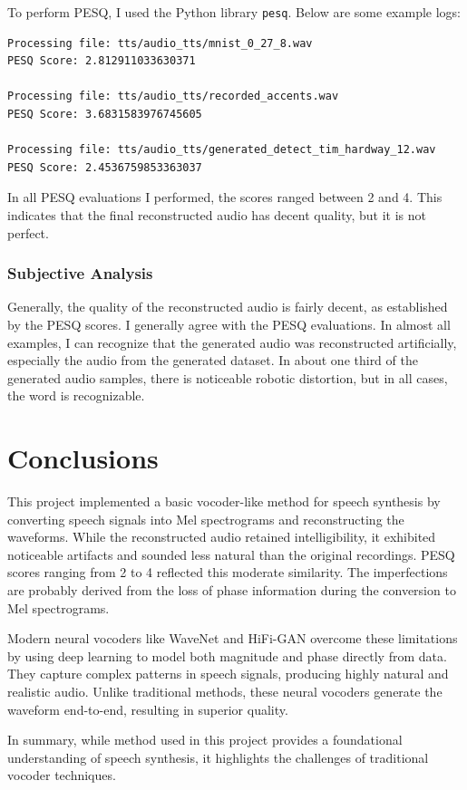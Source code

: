 \documentclass[12pt]{article}
\begin{document}
To perform PESQ, I used the Python library \texttt{pesq}. Below are some example logs:

\begin{verbatim}
Processing file: tts/audio_tts/mnist_0_27_8.wav
PESQ Score: 2.812911033630371

Processing file: tts/audio_tts/recorded_accents.wav
PESQ Score: 3.6831583976745605

Processing file: tts/audio_tts/generated_detect_tim_hardway_12.wav
PESQ Score: 2.4536759853363037
\end{verbatim}

In all PESQ evaluations I performed, the scores ranged between 2 and 4. This indicates that the final reconstructed audio has decent quality, but it is not perfect.

\subsubsection{Subjective Analysis}

Generally, the quality of the reconstructed audio is fairly decent, as established by the PESQ scores. I generally agree with the PESQ evaluations. In almost all examples, I can recognize that the generated audio was reconstructed artificially, especially the audio from the generated dataset. In about one third of the generated audio samples, there is noticeable robotic distortion, but in all cases, the word is recognizable.


\section{Conclusions}

This project implemented a basic vocoder-like method for speech synthesis by converting speech signals into Mel spectrograms and reconstructing the waveforms. While the reconstructed audio retained intelligibility, it exhibited noticeable artifacts and sounded less natural than the original recordings. PESQ scores ranging from 2 to 4 reflected this moderate similarity. The imperfections are probably derived from the loss of phase information during the conversion to Mel spectrograms.

Modern neural vocoders like WaveNet and HiFi-GAN overcome these limitations by using deep learning to model both magnitude and phase directly from data. They capture complex patterns in speech signals, producing highly natural and realistic audio. Unlike traditional methods, these neural vocoders generate the waveform end-to-end, resulting in superior quality.

In summary, while method used in this project provides a foundational understanding of speech synthesis, it highlights the challenges of traditional vocoder techniques.


\newpage


\end{document}
